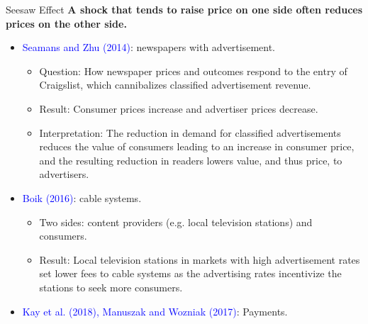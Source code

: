 \documentclass[aspectratio=169]{beamer}  %
\begin{document}
\begin{frame}{Seesaw Effect}
    \vspace{-0.5cm}
    \textbf{A shock that tends to raise price on one side often reduces prices on the other side.}
    \begin{itemize}
        \item \textcolor{blue}{Seamans and Zhu (2014)}: newspapers with advertisement.
        \begin{itemize}
            \item Question: How newspaper prices and outcomes respond to the entry of Craigslist, which cannibalizes classified advertisement revenue.
            \item Result: Consumer prices increase and advertiser prices decrease.
            \item Interpretation: The reduction in demand for classified advertisements reduces the value of consumers leading to an increase in consumer price, and the resulting reduction in readers lowers value, and thus price, to advertisers.
        \end{itemize}

        \item \textcolor{blue}{Boik (2016)}: cable systems.
        \begin{itemize}
            \item Two sides: content providers (e.g. local television stations) and consumers.
            \item Result: Local television stations in markets with high advertisement rates set lower fees to cable systems as the advertising rates incentivize the stations to seek more consumers.
        \end{itemize}

        \item \textcolor{blue}{Kay et al. (2018), Manuszak and Wozniak (2017)}: Payments.
    \end{itemize}

\end{frame}
\end{document}
